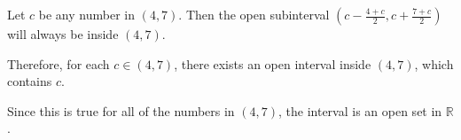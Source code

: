 \documentclass{ximera}
\begin{document}
\begin{example}
\begin{image}
  \end{image}




\begin{explanation}

Let $c$ be any number in $(4,7)$.  Then the open subinterval $\left( c - \frac{4+c}{2}, c + \frac{7+c}{2} \right)$ will always be inside $(4,7)$.

Therefore, for each $c \in (4, 7)$, there exists an open interval inside $(4,7)$, which contains $c$.

Since this is true for all of the numbers in $(4,7)$, the interval is an open set in $\mathbb{R}$.

\end{explanation}
\end{example}
\end{document}
